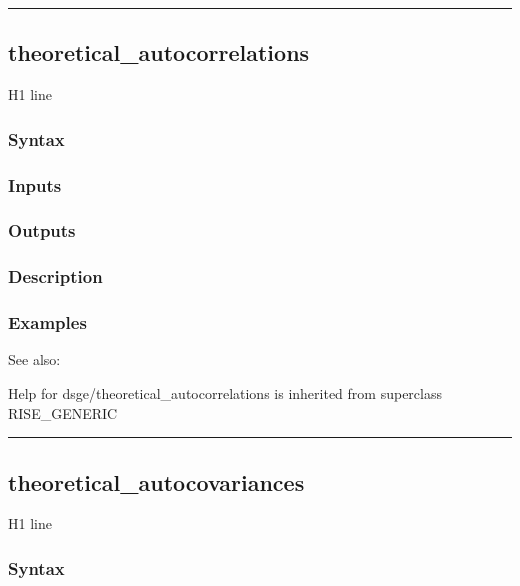 \documentclass[letterpaper,10pt,english]{sphinxmanual}
\begin{document}
\bigskip\hrule{}\bigskip



\subsection{theoretical\_autocorrelations}
\label{classes/models/@dsge/dsge:theoretical-autocorrelations}\label{classes/models/@dsge/dsge:id199}
H1 line


\subsubsection{Syntax}
\label{classes/models/@dsge/dsge:id200}

\subsubsection{Inputs}
\label{classes/models/@dsge/dsge:id201}

\subsubsection{Outputs}
\label{classes/models/@dsge/dsge:id202}

\subsubsection{Description}
\label{classes/models/@dsge/dsge:id203}

\subsubsection{Examples}
\label{classes/models/@dsge/dsge:id204}
See also:

Help for dsge/theoretical\_autocorrelations is inherited from superclass RISE\_GENERIC


\bigskip\hrule{}\bigskip



\subsection{theoretical\_autocovariances}
\label{classes/models/@dsge/dsge:theoretical-autocovariances}\label{classes/models/@dsge/dsge:id205}
H1 line


\subsubsection{Syntax}
\label{classes/models/@dsge/dsge:id206}
\end{document}
